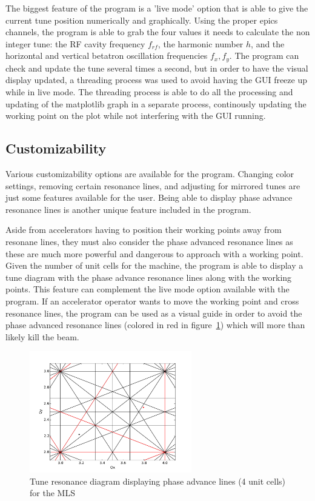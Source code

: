 \documentclass[%
 reprint,%
 amssymb, amsmath,%
 aip,cha,%
]{revtex4-1}
\begin{document}
The biggest feature of the program is a 'live mode' option that is able to give the current tune position numerically and graphically. Using the proper epics channels, the program is able to grab the four values it needs to calculate the non integer tune: the RF cavity frequency $f_{rf}$, the harmonic number $h$, and the horizontal and vertical betatron oscillation frequencies $f_x,f_y$. The program can check and update the tune several times a second, but in order to have the visual display updated, a threading process was used to avoid having the GUI freeze up while in live mode. The threading process is able to do all the processing and updating of the matplotlib graph in a separate process, continously updating the working point on the plot while not interfering with the GUI running.

\subsection{Customizability}
Various customizability options are available for the program. Changing color settings, removing certain resonance lines, and adjusting for mirrored tunes are just some features available for the user. Being able to display phase advance resonance lines is another unique feature included in the program.

Aside from accelerators having to position their working points away from resonane lines, they must also consider the phase advanced resonance lines as these are much more powerful and dangerous to approach with a working point. Given the number of unit cells for the machine, the program is able to display a tune diagram with the phase advance resonance lines along with the working points. This feature can complement the live mode option available with the program. If an accelerator operator wants to move the working point and cross resonance lines, the program can be used as a visual guide in order to avoid the phase advanced resonance lines (colored in red in figure~\ref{fig1}) which will more than likely kill the beam.
\begin{figure}[htb]
\begin{center}
\includegraphics[width=200pt]{image.pdf}
\caption{Tune resonance diagram displaying phase advance lines (4 unit cells) for the MLS}
\label{fig1}
\end{center}
\end{figure}
\end{document}
